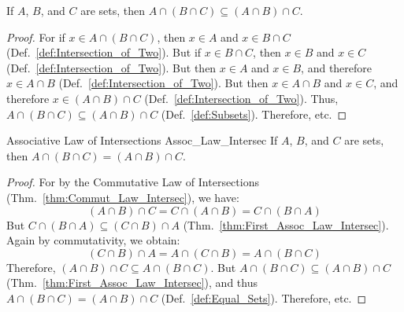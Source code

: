            \begin{theorem}
                \label{thm:First_Assoc_Law_Intersec}%
                If $A$, $B$, and $C$ are sets, then
                $A\cap(B\cap{C})\subseteq(A\cap{B})\cap{C}$.
            \end{theorem}
            \begin{proof}
                For if $x\in{A}\cap(B\cap{C})$, then $x\in{A}$
                and $x\in{B}\cap{C}$
                (Def.~\ref{def:Intersection_of_Two}). But if
                $x\in{B}\cap{C}$, then $x\in{B}$ and $x\in{C}$
                (Def.~\ref{def:Intersection_of_Two}). But then
                $x\in{A}$ and $x\in{B}$, and therefore
                $x\in{A}\cap{B}$
                (Def.~\ref{def:Intersection_of_Two}). But
                then $x\in{A}\cap{B}$ and $x\in{C}$, and
                therefore $x\in(A\cap{B})\cap{C}$
                (Def.~\ref{def:Intersection_of_Two}). Thus,
                $A\cap(B\cap{C})\subseteq(A\cap{B})\cap{C}$
                (Def.~\ref{def:Subsets}). Therefore, etc.
            \end{proof}
            \begin{ltheorem}{Associative Law of Intersections}
                  {Assoc_Law_Intersec}
                If $A$, $B$, and $C$ are sets, then
                $A\cap(B\cap{C})=(A\cap{B})\cap{C}$.
            \end{ltheorem}
            \begin{proof}
                For by the Commutative Law of Intersections
                (Thm.~\ref{thm:Commut_Law_Intersec}),
                we have:
                \begin{equation}
                    (A\cap{B})\cap{C}=C\cap(A\cap{B})
                                     =C\cap(B\cap{A})
                \end{equation}
                But $C\cap(B\cap{A})\subseteq(C\cap{B})\cap{A}$
                (Thm.~\ref{thm:First_Assoc_Law_Intersec}).
                Again by commutativity, we obtain:
                \begin{equation}
                    (C\cap{B})\cap{A}=A\cap(C\cap{B})
                                     =A\cap(B\cap{C})
                \end{equation}
                Therefore,
                $(A\cap{B})\cap{C}\subseteq{A}\cap(B\cap{C})$.
                But $A\cap(B\cap{C})\subseteq(A\cap{B})\cap{C}$
                (Thm.~\ref{thm:First_Assoc_Law_Intersec}),
                and thus $A\cap(B\cap{C})=(A\cap{B})\cap{C}$
                (Def.~\ref{def:Equal_Sets}). Therefore, etc.
            \end{proof}
